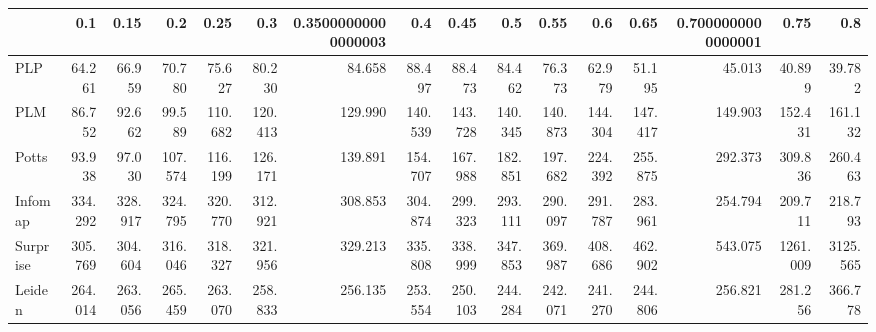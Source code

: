 \begin{tabular}{lrrrrrrrrrrrrrrr}
\toprule
{} &     0.1 &    0.15 &     0.2 &    0.25 &     0.3 & 0.35000000000000003 &     0.4 &    0.45 &     0.5 &    0.55 &     0.6 &    0.65 & 0.7000000000000001 &     0.75 &      0.8 \\
\midrule
PLP      &  64.261 &  66.959 &  70.780 &  75.627 &  80.230 &              84.658 &  88.497 &  88.473 &  84.462 &  76.373 &  62.979 &  51.195 &             45.013 &   40.899 &   39.782 \\
PLM      &  86.752 &  92.662 &  99.589 & 110.682 & 120.413 &             129.990 & 140.539 & 143.728 & 140.345 & 140.873 & 144.304 & 147.417 &            149.903 &  152.431 &  161.132 \\
Potts    &  93.938 &  97.030 & 107.574 & 116.199 & 126.171 &             139.891 & 154.707 & 167.988 & 182.851 & 197.682 & 224.392 & 255.875 &            292.373 &  309.836 &  260.463 \\
Infomap  & 334.292 & 328.917 & 324.795 & 320.770 & 312.921 &             308.853 & 304.874 & 299.323 & 293.111 & 290.097 & 291.787 & 283.961 &            254.794 &  209.711 &  218.793 \\
Surprise & 305.769 & 304.604 & 316.046 & 318.327 & 321.956 &             329.213 & 335.808 & 338.999 & 347.853 & 369.987 & 408.686 & 462.902 &            543.075 & 1261.009 & 3125.565 \\
Leiden   & 264.014 & 263.056 & 265.459 & 263.070 & 258.833 &             256.135 & 253.554 & 250.103 & 244.284 & 242.071 & 241.270 & 244.806 &            256.821 &  281.256 &  366.778 \\
\bottomrule
\end{tabular}
